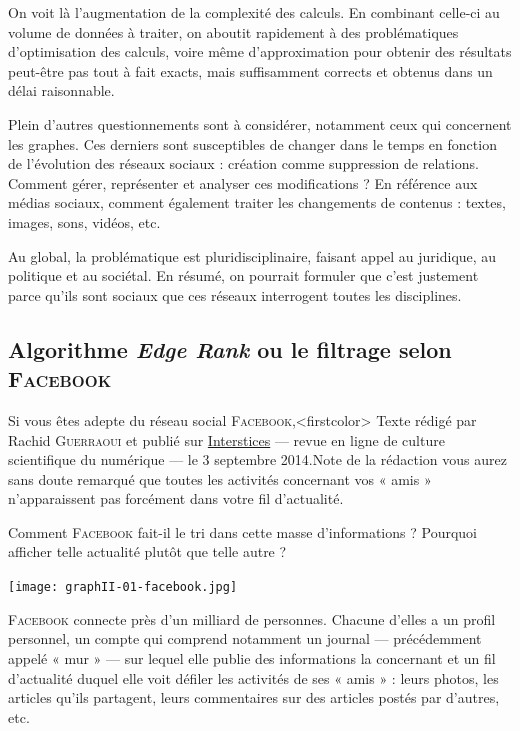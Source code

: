 On voit là l'augmentation de la complexité des calculs. En combinant celle-ci au volume de données à traiter, on aboutit rapidement à des problématiques d'optimisation des calculs, voire même d'approximation pour obtenir des résultats peut-être pas tout à fait exacts, mais suffisamment corrects et obtenus dans un délai raisonnable.

Plein d'autres questionnements sont à considérer, notamment ceux qui concernent les graphes. Ces derniers sont susceptibles de changer dans le temps en fonction de l'évolution des réseaux sociaux : création comme suppression de relations. Comment gérer, représenter et analyser ces modifications ? En référence aux médias sociaux, comment également traiter les changements de contenus : textes, images, sons, vidéos, etc.

Au global, la problématique est pluridisciplinaire, faisant appel au juridique, au politique et au sociétal. En résumé, on pourrait formuler que c'est justement parce qu'ils sont sociaux que ces réseaux interrogent toutes les disciplines.


\vfill\pagebreak


\subsection[Filtrage selon \textsc{Facebook}]{Algorithme \textit{Edge Rank} ou le filtrage selon \textsc{Facebook}}
\label{sub:II.1.2}

Si vous êtes adepte du réseau social \textsc{Facebook},\caution[t]<firstcolor>{%
Texte rédigé par Rachid \textsc{Guerraoui} et publié sur \href{https://interstices.info/lalgorithme-edge-rank-ou-le-filtrage-selon-facebook/}{Interstices} --- revue en ligne de culture scientifique du numérique --- le 3 septembre 2014.}{Note de la rédaction}
vous aurez sans doute remarqué que toutes les activités concernant vos « amis » n'apparaissent pas forcément dans votre fil d'actualité. 

Comment \textsc{Facebook} fait-il le tri dans cette masse d'informations ? Pourquoi afficher telle actualité plutôt que telle autre ?

\begin{graphic}
\texttt{[image: graphII-01-facebook.jpg]}
\end{graphic}
\vspace{-\baselineskip}

\textsc{Facebook} connecte près d'un milliard de personnes. Chacune d'elles a un profil personnel, un compte qui comprend notamment un journal --- précédemment appelé « mur » --- sur lequel elle publie des informations la concernant et un fil d'actualité duquel elle voit défiler les activités de ses « amis » : leurs photos, les articles qu'ils partagent, leurs commentaires sur des articles postés par d'autres, etc.

